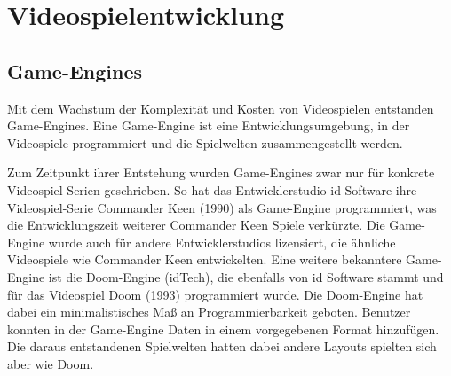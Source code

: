 


\lstset{style=mystyle}

\chapter{Videospielentwicklung}
\label{chap:videospielentwicklung}



\section{Game-Engines}
\label{chap:game engines}

Mit dem Wachstum der Komplexit\"{a}t und Kosten von Videospielen entstanden Game-Engines. Eine Game-Engine ist eine Entwicklungsumgebung, in der Videospiele programmiert und die Spielwelten zusammengestellt werden. 

Zum Zeitpunkt ihrer Entstehung wurden Game-Engines zwar nur f\"{u}r konkrete Videospiel-Serien geschrieben. So hat das Entwicklerstudio id Software ihre Videospiel-Serie Commander Keen (1990) als Game-Engine programmiert, was die Entwicklungszeit weiterer Commander Keen Spiele verk\"{u}rzte. Die Game-Engine wurde auch f\"{u}r andere Entwicklerstudios lizensiert, die \"{a}hnliche Videospiele wie Commander Keen entwickelten. Eine weitere bekanntere Game-Engine ist die Doom-Engine (idTech), die ebenfalls von id Software stammt und f\"{u}r das Videospiel Doom (1993) programmiert wurde. Die Doom-Engine hat dabei ein minimalistisches Ma\ss{} an Programmierbarkeit geboten. Benutzer konnten in der Game-Engine Daten in einem vorgegebenen Format hinzuf\"{u}gen. Die daraus entstandenen Spielwelten hatten dabei andere Layouts spielten sich aber wie Doom.\autocite{lewis2002game}

